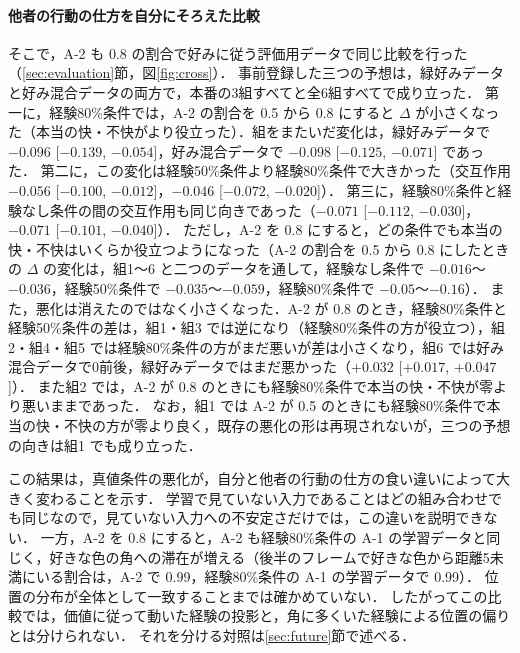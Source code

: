 \paragraph{他者の行動の仕方を自分にそろえた比較}
そこで，A-2 も 0.8 の割合で好みに従う評価用データで同じ比較を行った（\ref{sec:evaluation}節，図\ref{fig:cross}）．
事前登録した三つの予想は，緑好みデータと好み混合データの両方で，本番の3組すべてと全6組すべてで成り立った．
第一に，経験80\%条件では，A-2 の割合を 0.5 から 0.8 にすると $\Delta$ が小さくなった（本当の快・不快がより役立った）．組をまたいだ変化は，緑好みデータで $-0.096$ [$-0.139$, $-0.054$]，好み混合データで $-0.098$ [$-0.125$, $-0.071$] であった．
第二に，この変化は経験50\%条件より経験80\%条件で大きかった（交互作用 $-0.056$ [$-0.100$, $-0.012$]，$-0.046$ [$-0.072$, $-0.020$]）．
第三に，経験80\%条件と経験なし条件の間の交互作用も同じ向きであった（$-0.071$ [$-0.112$, $-0.030$]，$-0.071$ [$-0.101$, $-0.040$]）．
ただし，A-2 を 0.8 にすると，どの条件でも本当の快・不快はいくらか役立つようになった（A-2 の割合を 0.5 から 0.8 にしたときの $\Delta$ の変化は，組1〜6 と二つのデータを通して，経験なし条件で $-0.016$〜$-0.036$，経験50\%条件で $-0.035$〜$-0.059$，経験80\%条件で $-0.05$〜$-0.16$）．
また，悪化は消えたのではなく小さくなった．A-2 が 0.8 のとき，経験80\%条件と経験50\%条件の差は，組1・組3 では逆になり（経験80\%条件の方が役立つ），組2・組4・組5 では経験80\%条件の方がまだ悪いが差は小さくなり，組6 では好み混合データで0前後，緑好みデータではまだ悪かった（$+0.032$ [$+0.017$, $+0.047$]）．
また組2 では，A-2 が 0.8 のときにも経験80\%条件で本当の快・不快が零より悪いままであった．
なお，組1 では A-2 が 0.5 のときにも経験80\%条件で本当の快・不快の方が零より良く，既存の悪化の形は再現されないが，三つの予想の向きは組1 でも成り立った．

この結果は，真値条件の悪化が，自分と他者の行動の仕方の食い違いによって大きく変わることを示す．
学習で見ていない入力であることはどの組み合わせでも同じなので，見ていない入力への不安定さだけでは，この違いを説明できない．
一方，A-2 を 0.8 にすると，A-2 も経験80\%条件の A-1 の学習データと同じく，好きな色の角への滞在が増える（後半のフレームで好きな色から距離5未満にいる割合は，A-2 で 0.99，経験80\%条件の A-1 の学習データで 0.99）．
位置の分布が全体として一致することまでは確かめていない．
したがってこの比較では，価値に従って動いた経験の投影と，角に多くいた経験による位置の偏りとは分けられない．
それを分ける対照は\ref{sec:future}節で述べる．

